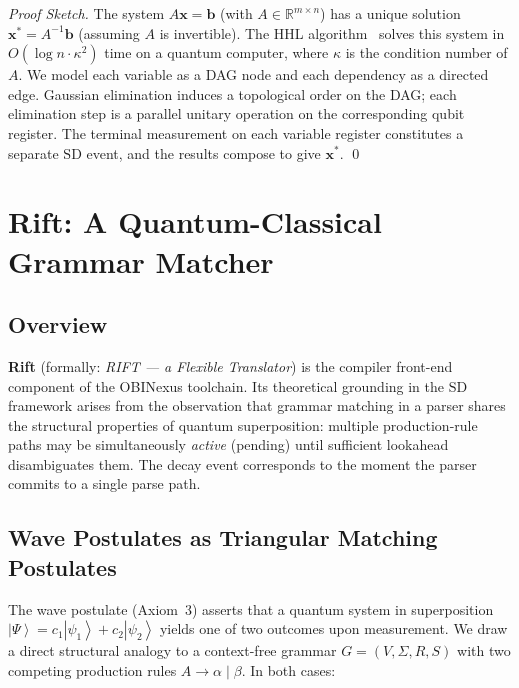 \documentclass[11pt]{article}
\theoremstyle{plain}
\theoremstyle{definition}
\theoremstyle{remark}
\newcommand{\ket}[1]{\left| #1 \right\rangle}
\newcommand{\SD}{\ensuremath{\mathrm{SD}}}   %
\newcommand{\Real}{\mathbb{R}}
\begin{document}
\begin{proof}[Proof Sketch]
  The system $A\mathbf{x} = \mathbf{b}$ (with $A \in \Real^{m \times n}$)
  has a unique solution $\mathbf{x}^* = A^{-1}\mathbf{b}$ (assuming $A$ is
  invertible).  The HHL algorithm~\cite{harrow2009} solves this system in
  $O(\log n \cdot \kappa^2)$ time on a quantum computer, where $\kappa$ is
  the condition number of $A$.  We model each variable as a DAG node and
  each dependency as a directed edge.  Gaussian elimination induces a
  topological order on the DAG; each elimination step is a parallel unitary
  operation on the corresponding qubit register.  The terminal measurement
  on each variable register constitutes a separate \SD{} event, and the
  results compose to give $\mathbf{x}^*$. \qed
\end{proof}

\section{Rift: A Quantum-Classical Grammar Matcher}
\label{sec:rift}

\subsection{Overview}

\textbf{Rift} (formally: \emph{RIFT --- a Flexible Translator}) is the
compiler front-end component of the OBINexus toolchain.  Its theoretical
grounding in the \SD{} framework arises from the observation that grammar
matching in a parser shares the structural properties of quantum superposition:
multiple production-rule paths may be simultaneously \emph{active} (pending)
until sufficient lookahead disambiguates them.  The decay event corresponds to
the moment the parser commits to a single parse path.

\subsection{Wave Postulates as Triangular Matching Postulates}

The wave postulate (Axiom~3) asserts that a quantum system in superposition
$\ket{\Psi} = c_1 \ket{\psi_1} + c_2 \ket{\psi_2}$ yields one of two outcomes
upon measurement.  We draw a direct structural analogy to a context-free
grammar $G = (V, \Sigma, R, S)$ with two competing production rules
$A \to \alpha \mid \beta$.  In both cases:
\end{document}
